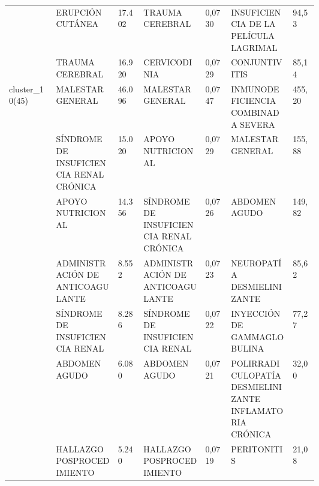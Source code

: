 \begin{landscape}
\begin{longtable}[c]{@{}lp{0.2\linewidth}lp{0.2\linewidth}lp{0.2\linewidth}l@{}}
                                  & ERUPCIÓN CUTÁNEA                                              & 17.402 & TRAUMA CEREBRAL                                        & 0,0730 & INSUFICIENCIA DE LA PELÍCULA LAGRIMAL                         & 94,53    \\
                                  & TRAUMA CEREBRAL                                               & 16.920 & CERVICODINIA                                           & 0,0729 & CONJUNTIVITIS                                                 & 85,14    \\
\multirow{10}{*}{cluster\_10(45)} & MALESTAR GENERAL                                              & 46.096 & MALESTAR GENERAL                                       & 0,0747 & INMUNODEFICIENCIA COMBINADA SEVERA                            & 455,20   \\
                                  & SÍNDROME DE INSUFICIENCIA RENAL CRÓNICA                       & 15.020 & APOYO NUTRICIONAL                                      & 0,0729 & MALESTAR GENERAL                                              & 155,88   \\
                                  & APOYO NUTRICIONAL                                             & 14.356 & SÍNDROME DE INSUFICIENCIA RENAL CRÓNICA                & 0,0726 & ABDOMEN AGUDO                                                 & 149,82   \\
                                  & ADMINISTRACIÓN DE ANTICOAGULANTE                              & 8.552  & ADMINISTRACIÓN DE ANTICOAGULANTE                       & 0,0723 & NEUROPATÍA DESMIELINIZANTE                                    & 85,62    \\
                                  & SÍNDROME DE INSUFICIENCIA RENAL                               & 8.286  & SÍNDROME DE INSUFICIENCIA RENAL                        & 0,0722 & INYECCIÓN DE GAMMAGLOBULINA                                   & 77,27    \\
                                  & ABDOMEN AGUDO                                                 & 6.080  & ABDOMEN AGUDO                                          & 0,0721 & POLIRRADICULOPATÍA DESMIELINIZANTE INFLAMATORIA CRÓNICA       & 32,00    \\
                                  & HALLAZGO POSPROCEDIMIENTO                                     & 5.240  & HALLAZGO POSPROCEDIMIENTO                              & 0,0719 & PERITONITIS                                                   & 21,08    \\

\end{longtable}
\end{landscape}

